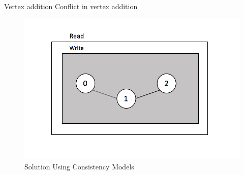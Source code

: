 \begin{frame}{Vertex addition}
	Conflict in vertex addition
			\begin{figure}
			\includegraphics[width=0.8\linewidth]{figures/vnode1.png}
			\caption{Solution Using Consistency Models}
			\end{figure}
\end{frame}

